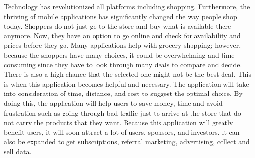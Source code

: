 Technology has revolutionized all platforms including shopping. Furthermore, the thriving of mobile applications has significantly changed the way people shop today. Shoppers do not just go to the store and buy what is available there anymore. Now, they have an option to go online and check for availability and prices before they go. Many applications help with grocery shopping; however, because the shoppers have many choices, it could be overwhelming and time-consuming since they have to look through many deals to compare and decide. There is also a high chance that the selected one might not be the best deal. This is when this application becomes helpful and necessary. The application will take into consideration of time, distance, and cost to suggest the optimal choice. By doing this, the application will help users to save money, time and avoid frustration such as going through bad traffic just to arrive at the store that do not carry the products that they want. Because this application will greatly benefit users, it will soon attract a lot of users, sponsors, and investors. It can also be expanded to get subscriptions, referral marketing, advertising, collect and sell data.